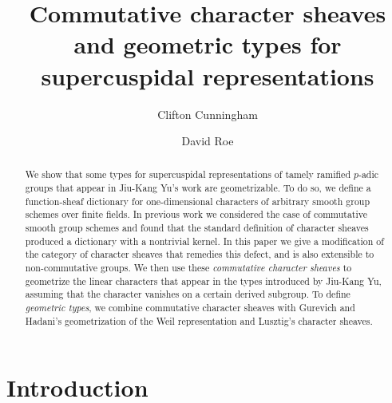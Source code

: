 \documentclass[10pt]{amsart}
\title[Commutative character sheaves and geometric types]{Commutative character sheaves and geometric types for supercuspidal representations}
\author{Clifton Cunningham}
\author{David Roe}
\theoremstyle{plain}
\theoremstyle{definition}
\begin{document}
\begin{abstract}
We show that some types for supercuspidal representations of tamely ramified $p$-adic groups that appear in Jiu-Kang Yu's work are geometrizable.
To do so, we define a function-sheaf dictionary for one-dimen\-sion\-al characters of arbitrary smooth group schemes over finite fields.  
In previous work we considered the case of commutative smooth group schemes and found that the standard definition of character sheaves produced a dictionary with a nontrivial kernel.  
In this paper we give a modification of the category of character sheaves that remedies this defect, and is also extensible to non-commutative groups.  
We then use these \emph{commutative character sheaves} to geometrize the linear characters that appear in the types introduced by Jiu-Kang Yu, assuming that the character vanishes on a certain derived subgroup.
To define \emph{geometric types}, we combine commutative character sheaves with Gurevich and Hadani's geometrization of the Weil representation and Lusztig's character sheaves.
\end{abstract}

\maketitle

\tableofcontents

\section*{Introduction}
\end{document}
